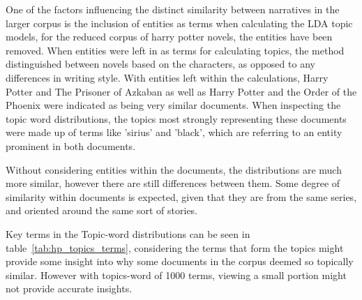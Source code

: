 \documentclass[10pt]{report}
\begin{document}
One of the factors influencing the distinct similarity between narratives in the larger corpus is the inclusion of entities as terms when calculating the LDA topic models, for the reduced corpus of harry potter novels, the entities have been removed. When entities were left in as terms for calculating topics, the method distinguished between novels based on the characters, as opposed to any differences in writing style. With entities left within the calculations, Harry Potter and The Prisoner of Azkaban as well as Harry Potter and the Order of the Phoenix were indicated as being very similar documents. When inspecting the topic word distributions, the topics most strongly representing these documents were made up of terms like 'sirius' and 'black', which are referring to an entity prominent in both documents.

Without considering entities within the documents, the distributions are much more similar, however there are still differences between them. Some degree of similarity within documents is expected, given that they are from the same series, and oriented around the same sort of stories.

Key terms in the Topic-word distributions can be seen in table~\ref{tab:hp_topics_terms}, considering the terms that form the topics might provide some insight into why some documents in the corpus deemed so topically similar. However with topics-word of 1000 terms, viewing a small portion might not provide accurate insights.

\begin{table}[h!]
  \centering
  \caption{Top Ten Words in the Topic-Word Distributions of Calculated Topics for the Harry Potter Corpus\label{tab:hp_topics_terms}}
\end{table}
\end{document}
